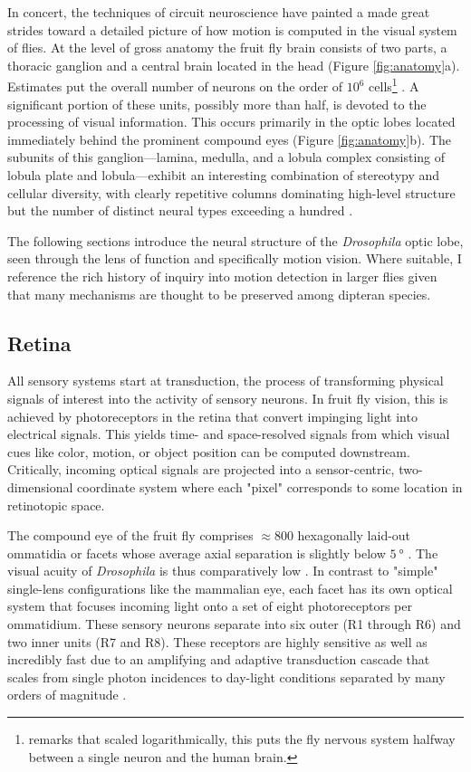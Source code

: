 In concert, the techniques of circuit neuroscience have painted a made great strides toward a detailed picture of how motion is computed in the visual system of flies. At the level of gross anatomy the fruit fly brain consists of two parts, a thoracic ganglion and a central brain located in the head (Figure \ref{fig:anatomy}a). Estimates put the overall number of neurons on the order of $10^6$ cells\footnote{\citet{Benzer:1967aa} remarks that scaled logarithmically, this puts the fly nervous system halfway between a single neuron and the human brain.} \citep{Morante:2004aa}. A significant portion of these units, possibly more than half, is devoted to the processing of visual information. This occurs primarily in the optic lobes located immediately behind the prominent compound eyes (Figure \ref{fig:anatomy}b). The subunits of this ganglion---lamina, medulla, and a lobula complex consisting of lobula plate and lobula---exhibit an interesting combination of stereotypy and cellular diversity, with clearly repetitive columns dominating high-level structure but the number of distinct neural types exceeding a hundred \citep{Fischbach:1989uw}.

The following sections introduce the neural structure of the \textit{Drosophila} optic lobe, seen through the lens of function and specifically motion vision. Where suitable, I reference the rich history of inquiry into motion detection in larger flies given that many mechanisms are thought to be preserved among dipteran species.


\subsection{Retina}
All sensory systems start at transduction, the process of transforming physical signals of interest into the activity of sensory neurons. In fruit fly vision, this is achieved by photoreceptors in the retina that convert impinging light into electrical signals. This yields time- and space-resolved signals from which visual cues like color, motion, or object position can be computed downstream. Critically, incoming optical signals are projected into a sensor-centric, two-dimensional coordinate system where each "pixel" corresponds to some location in retinotopic space.

The compound eye of the fruit fly comprises $\approx 800$ hexagonally laid-out ommatidia or facets whose average axial separation is slightly below $\SI{5}{\degree}$ \citep[for a detailed map of the somewhat inhomogeneous fruit fly eye, as compiled by Erich Buchner, see][]{Heisenberg:1984aa}. The visual acuity of \textit{Drosophila} is thus comparatively low \citep{Land:1997aa}. In contrast to "simple" single-lens configurations like the mammalian eye, each facet has its own optical system that focuses incoming light onto a set of eight photoreceptors per ommatidium. These sensory neurons separate into six outer (R1 through R6) and two inner units (R7 and R8). These receptors are highly sensitive as well as incredibly fast due to an amplifying and adaptive transduction cascade that scales from single photon incidences to day-light conditions separated by many orders of magnitude \citep{Hardie:2001aa,Hardie:2015aa}.

